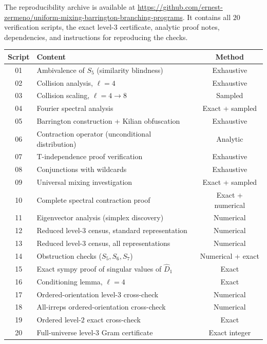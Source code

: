 \documentclass[version=final]{iacrcc}
\newcommand{\Dhat}{\widehat{D}}
\begin{document}
The reproducibility archive is available at
\url{https://github.com/ernest-zermeno/uniform-mixing-barrington-branching-programs}.
It contains all $20$ verification
scripts, the exact level-$3$ certificate, analytic proof notes, dependencies,
and instructions for reproducing the checks.

\begin{center}
\begin{tabular}{clc}
\toprule
Script & Content & Method \\
\midrule
01 & Ambivalence of $S_5$ (similarity blindness) & Exhaustive \\
02 & Collision analysis, $\ell = 4$ & Exhaustive \\
03 & Collision scaling, $\ell = 4 \to 8$ & Sampled \\
04 & Fourier spectral analysis & Exact + sampled \\
05 & Barrington construction + Kilian obfuscation & Exhaustive \\
06 & Contraction operator (unconditional distribution) & Analytic \\
07 & T-independence proof verification & Exhaustive \\
08 & Conjunctions with wildcards & Exhaustive \\
09 & Universal mixing investigation & Exact + sampled \\
10 & Complete spectral contraction proof & Exact + numerical \\
11 & Eigenvector analysis (simplex discovery) & Numerical \\
12 & Reduced level-$3$ census, standard representation & Numerical \\
13 & Reduced level-$3$ census, all representations & Numerical \\
14 & Obstruction checks ($S_5, S_6, S_7$) & Numerical + exact \\
15 & Exact sympy proof of singular values of $\Dhat_1$ & Exact \\
16 & Conditioning lemma, $\ell = 4$ & Exact \\
17 & Ordered-orientation level-$3$ cross-check & Numerical \\
18 & All-irreps ordered-orientation cross-check & Numerical \\
19 & Ordered level-$2$ exact cross-check & Exact \\
20 & Full-universe level-$3$ Gram certificate & Exact integer \\
\bottomrule
\end{tabular}
\end{center}
\end{document}

